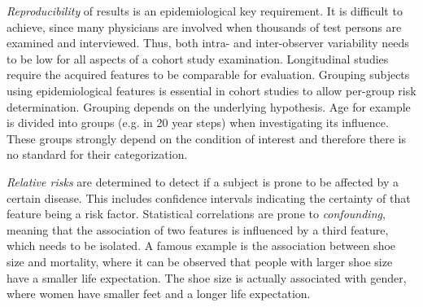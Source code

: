 \documentclass[journal]{style/vgtc} 			          %
\newcommand{\add}[1]{\textcolor{blue}{\uline{#1}}}
\begin{document}
\emph{Reproducibility} of results is an epidemiological key requirement.
%
It is difficult to achieve, since many physicians are involved when thousands of test persons are examined and interviewed.
%
Thus, both intra- and inter-observer variability needs to be low for all aspects of a cohort study examination.
%
Longitudinal studies require the acquired features to be comparable for evaluation.
%
%
%
Grouping subjects using epidemiological features is essential in cohort studies to allow per-group risk determination.
%
Grouping depends on the underlying hypothesis.
%
Age for example is divided into groups (e.g. in 20 year steps) when investigating its influence.
%
These groups strongly depend on the condition of interest and therefore there is no standard for their categorization.

%
\emph{Relative risks} are determined to detect if a subject is prone to be affected by a certain disease.
%
This includes confidence intervals indicating the certainty of that feature being a risk factor.
%
Statistical correlations are prone to \emph{confounding}, meaning that the association of two features is influenced by a third feature, which needs to be isolated.
%
A famous example is the association between shoe size and mortality, where it can be observed that people with larger shoe size have a smaller life expectation. %
%
The shoe size is actually associated with gender, where women have smaller feet and a longer life expectation.
%
%
%
%
%
\end{document}
